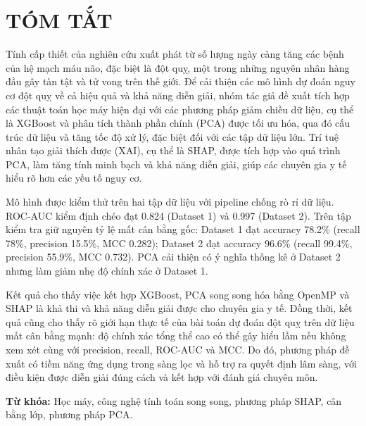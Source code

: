 \chapter*{TÓM TẮT}
Tính cấp thiết của nghiên cứu xuất phát từ số lượng ngày càng tăng các bệnh của hệ mạch máu não, đặc biệt là đột quỵ, một trong những nguyên nhân hàng đầu gây tàn tật và tử vong trên thế giới. Để cải thiện các mô hình dự đoán nguy cơ đột quỵ về cả hiệu quả và khả năng diễn giải, nhóm tác giả đề xuất tích hợp các thuật toán học máy hiện đại với các phương pháp giảm chiều dữ liệu, cụ thể là XGBoost và phân tích thành phần chính (PCA) được tối ưu hóa, qua đó cấu trúc dữ liệu và tăng tốc độ xử lý, đặc biệt đối với các tập dữ liệu lớn. Trí tuệ nhân tạo giải thích được (XAI), cụ thể là SHAP, được tích hợp vào quá trình PCA, làm tăng tính minh bạch và khả năng diễn giải, giúp các chuyên gia y tế hiểu rõ hơn các yếu tố nguy cơ.

\noindent Mô hình được kiểm thử trên hai tập dữ liệu với pipeline chống rò rỉ dữ liệu. ROC-AUC kiểm định chéo đạt 0.824 (Dataset 1) và 0.997 (Dataset 2). Trên tập kiểm tra giữ nguyên tỷ lệ mất cân bằng gốc: Dataset 1 đạt accuracy 78.2\% (recall 78\%, precision 15.5\%, MCC 0.282); Dataset 2 đạt accuracy 96.6\% (recall 99.4\%, precision 55.9\%, MCC 0.732). PCA cải thiện có ý nghĩa thống kê ở Dataset 2 nhưng làm giảm nhẹ độ chính xác ở Dataset 1.

\noindent Kết quả cho thấy việc kết hợp XGBoost, PCA song song hóa bằng OpenMP và SHAP là khả thi và khả năng diễn giải được cho chuyên gia y tế. Đồng thời, kết quả cũng cho thấy rõ giới hạn thực tế của bài toán dự đoán đột quỵ trên dữ liệu mất cân bằng mạnh: độ chính xác tổng thể cao có thể gây hiểu lầm nếu không xem xét cùng với precision, recall, ROC-AUC và MCC. Do đó, phương pháp đề xuất có tiềm năng ứng dụng trong sàng lọc và hỗ trợ ra quyết định lâm sàng, với điều kiện được diễn giải đúng cách và kết hợp với đánh giá chuyên môn.

\noindent\textbf{Từ khóa:} Học máy, công nghệ tính toán song song, phương pháp SHAP, cân bằng lớp, phương pháp PCA.
